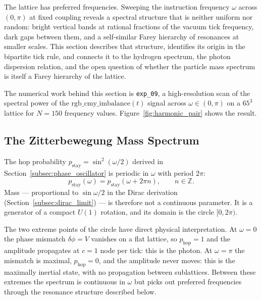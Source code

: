
\label{sec:harmonics}

The lattice has preferred frequencies. Sweeping the instruction
frequency $\omega$ across $(0, \pi)$ at fixed coupling reveals a
spectral structure that is neither uniform nor random: bright
vertical bands at rational fractions of the vacuum tick frequency,
dark gaps between them, and a self-similar Farey hierarchy of
resonances at smaller scales.
This section describes that structure, identifies its origin in the
bipartite tick rule, and connects it to the hydrogen spectrum, the
photon dispersion relation, and the open question of whether the
particle mass spectrum is itself a Farey hierarchy of the lattice.

The numerical work behind this section is \texttt{exp\_09}, a
high-resolution scan of the spectral power of the
$\mathrm{rgb\_cmy\_imbalance}(t)$ signal across $\omega \in (0, \pi)$
on a $65^3$ lattice for $N = 150$ frequency values.
Figure~\ref{fig:harmonic_pair} shows the result.

\subsection{The Zitterbewegung Mass Spectrum}
\label{subsec:mass_spectrum}

The hop probability $p_\text{stay} = \sin^2(\omega/2)$ derived in
Section~\ref{subsec:phase_oscillator} is periodic in $\omega$ with
period $2\pi$:
\begin{equation}
    p_\text{stay}(\omega) = p_\text{stay}(\omega + 2\pi n),
        \qquad n \in \mathbb{Z}.
    \label{eq:omega_periodic}
\end{equation}
Mass --- proportional to $\sin\omega/2$ in the Dirac derivation
(Section~\ref{subsec:dirac_limit}) --- is therefore not a continuous
parameter. It is a generator of a compact $U(1)$ rotation, and its
domain is the circle $[0, 2\pi)$.

The two extreme points of the circle have direct physical
interpretation. At $\omega = 0$ the phase mismatch
$\delta\phi = V$ vanishes on a flat lattice, so $p_\text{hop} = 1$
and the amplitude propagates at $c = 1$ node per tick: this is the
photon. At $\omega = \pi$ the mismatch is maximal,
$p_\text{hop} = 0$, and the amplitude never moves: this is the
maximally inertial state, with no propagation between sublattices.
Between these extremes the spectrum is continuous in $\omega$ but
picks out preferred frequencies through the resonance structure
described below.

